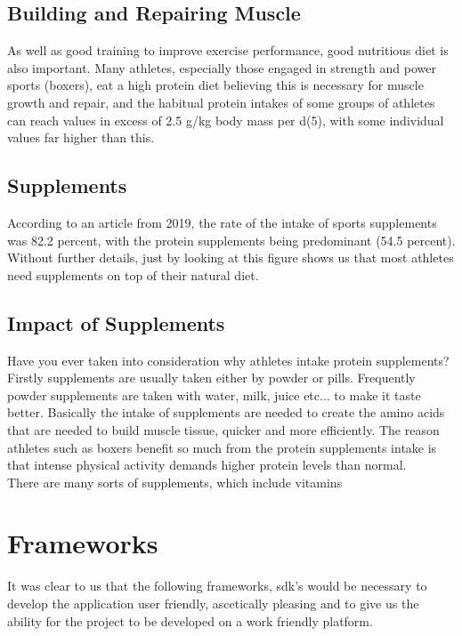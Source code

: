 \documentclass[a4paper,12pt]{report}
\begin{document}
\subsection{Building and Repairing Muscle}
As well as good training to improve exercise performance, good nutritious diet is also important. Many athletes, especially those engaged in strength and power sports (boxers), eat a high protein diet believing this is necessary for muscle growth and repair, and the habitual protein intakes of some groups of athletes can reach values in excess of 2.5 g/kg body mass per d(5), with some individual values far higher than this.
\cite{maughan2012nutrition}
\subsection{Supplements}
According to an article from 2019, the rate of the intake of sports supplements was 82.2 percent, with the protein supplements being predominant (54.5 percent). Without further details, just by looking at this figure shows us that most athletes need supplements on top of their natural diet.
\cite{Supplements}
\subsection{Impact of Supplements}
Have you ever taken into consideration why athletes intake protein supplements?\\ Firstly supplements are usually taken either by powder or pills. Frequently powder supplements are taken with water, milk, juice etc... to make it taste better. Basically the intake of supplements are needed to create the amino acids that are needed to build muscle tissue, quicker and more efficiently. The reason athletes such as boxers benefit so much from the protein supplements intake is that intense physical activity demands higher protein levels than normal.
\\
There are many sorts of supplements, which include vitamins 
\newpage
\section{Frameworks}

It was clear to us that the following frameworks, sdk's would be necessary to develop the application user friendly, ascetically pleasing and to give us the ability for the project to be developed on a work friendly platform.
\end{document}
